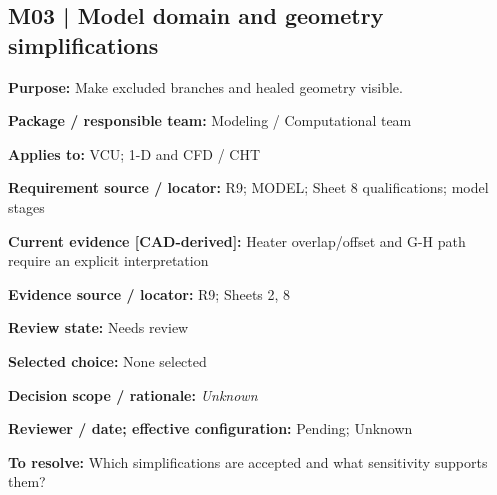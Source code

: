 \documentclass[11pt]{article}
\begin{document}
\par\noindent\begin{minipage}{\textwidth}\small\setlength{\parskip}{2pt}
\subsection*{M03 | Model domain and geometry simplifications}
\textbf{Purpose:} Make excluded branches and healed geometry visible.\par
\textbf{Package / responsible team:} Modeling / Computational team\par
\textbf{Applies to:} VCU; 1-D and CFD / CHT\par
\textbf{Requirement source / locator:} R9; MODEL; Sheet 8 qualifications; model stages\par
\textbf{Current evidence [CAD-derived]:} Heater overlap/offset and G-H path require an explicit interpretation\par
\textbf{Evidence source / locator:} R9; Sheets 2, 8\par
\textbf{Review state:} Needs review\par
\textbf{Selected choice:} None selected\par
\textbf{Decision scope / rationale:} \textit{Unknown}\par
\textbf{Reviewer / date; effective configuration:} Pending; Unknown\par
\textbf{To resolve:} Which simplifications are accepted and what sensitivity supports them?\par
\end{minipage}\par\vspace{5pt}
\end{document}
